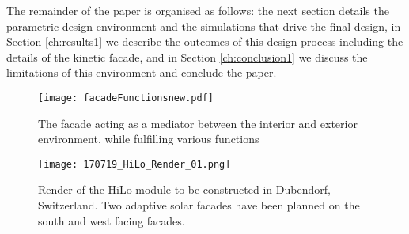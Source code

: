 The remainder of the paper is organised as follows: the next section details the parametric design environment and the simulations that drive the final design, in Section \ref{ch:results1} we describe the outcomes of this design process including the details of the kinetic facade, and in Section \ref{ch:conclusion1} we discuss the limitations of this environment and conclude the paper. 



\begin{figure}
\begin{center}
\texttt{[image: facadeFunctionsnew.pdf]}
\caption{The facade acting as a mediator between the interior and exterior environment, while fulfilling various functions \cite{nagy2016adaptive}}
\label{fig:ASFschematic}
\end{center}
\end{figure}

\begin{figure}
\begin{center}
\texttt{[image: 170719\_HiLo\_Render\_01.png]}
\caption{Render of the HiLo module to be constructed in Dubendorf, Switzerland. Two adaptive solar facades have been planned on the south and west facing facades.}
\label{fig:HiLo}
\end{center}
\end{figure}





